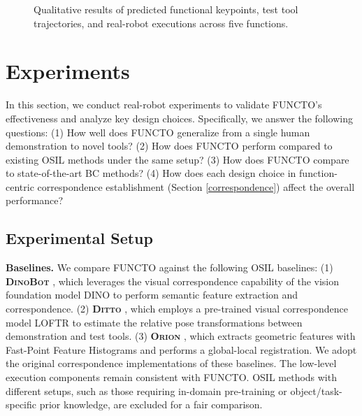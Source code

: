 \begin{figure*}[t]
  \centering
  \vspace*{-0.2in}
  \hspace*{-0.1in} %
    \vspace*{-0.2in}
  \caption{Qualitative results of predicted functional keypoints, test tool trajectories, and real-robot executions across five functions.}
  \label{fig:qualitative}
  \vspace*{-0.2in}
\end{figure*} 





\section{Experiments}
In this section, we conduct real-robot experiments to validate FUNCTO's effectiveness and analyze key design choices. Specifically, we answer the following questions: (1) How well does FUNCTO generalize from a single human demonstration to novel tools? (2) How does FUNCTO perform compared to existing OSIL methods under the same setup? (3) How does FUNCTO compare to state-of-the-art BC methods? (4) How does each design choice in function-centric correspondence establishment (Section \ref{correspondence}) affect the overall performance?

\subsection{Experimental Setup}

\noindent \textbf{Baselines.} We compare FUNCTO against the following OSIL baselines: (1) \textbf{\textsc{DinoBot}} \cite{vitiello2023one, di2024dinobot}, which leverages the visual correspondence capability of the vision foundation model DINO to perform semantic feature extraction and correspondence. (2) \textbf{\textsc{Ditto}} \cite{heppert2024ditto}, which employs a pre-trained visual correspondence model LOFTR to estimate the relative pose transformations between demonstration and test tools. (3) \textbf{\textsc{Orion}} \cite{zhu2024vision, li2024okami}, which extracts geometric features with Fast-Point Feature Histograms and performs a global-local registration. We adopt the original correspondence implementations of these baselines. The low-level execution components remain consistent with FUNCTO. OSIL methods with different setups, such as those requiring in-domain pre-training or object/task-specific prior knowledge, are excluded for a fair comparison.

